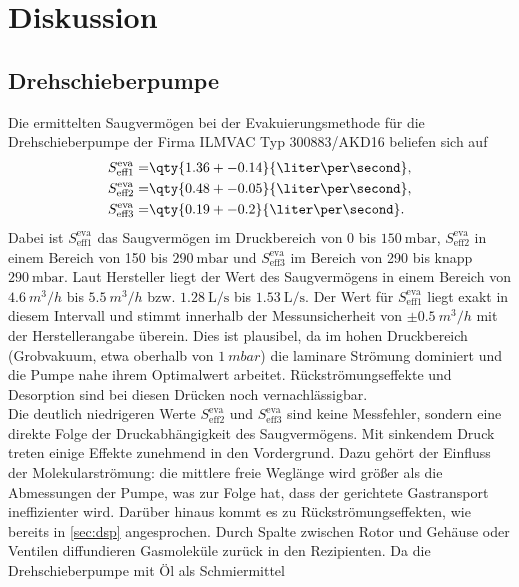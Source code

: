 \section{Diskussion}
\label{sec:Diskussion}

\subsection{Drehschieberpumpe}
Die ermittelten Saugvermögen bei der Evakuierungsmethode für die Drehschieberpumpe
der Firma ILMVAC Typ 300883/AKD16 beliefen sich auf 
\begin{align*}
    S_\text{eff1}^\text{eva} =& \qty{1.36+-0.14}{\liter\per\second}, \\
    S_\text{eff2}^\text{eva} =& \qty{0.48+-0.05}{\liter\per\second}, \\
    S_\text{eff3}^\text{eva} =& \qty{0.19+-0.2}{\liter\per\second}.
\end{align*}
Dabei ist $S_\text{eff1}^\text{eva}$ das Saugvermögen im Druckbereich von 0 bis 
$\qty{150}{\milli\bar}$, $S_\text{eff2}^\text{eva}$ in einem Bereich von 150 bis 
$\qty{290}{\milli\bar}$ und $S_\text{eff3}^\text{eva}$ im Bereich von 290 bis 
knapp $\qty{290}{\milli\bar}$. Laut Hersteller liegt der Wert des Saugvermögens 
in einem Bereich von $\qty{4.6}{m^3/h}$ bis $\qty{5.5}{m^3/h}$ bzw. 
$\qty{1.28}{\liter\per\second}$ bis $\qty{1.53}{\liter\per\second}$. Der Wert für 
$S_\text{eff1}^\text{eva}$ liegt exakt in diesem Intervall und stimmt innerhalb
der Messunsicherheit von $±\qty{0.5}{m^3/h}$ mit der Herstellerangabe überein.
Dies ist plausibel, da im hohen Druckbereich (Grobvakuum, etwa oberhalb von
$\qty{1}{mbar}$) die laminare Strömung dominiert und die Pumpe nahe ihrem
Optimalwert arbeitet. Rückströmungseffekte und Desorption sind bei diesen Drücken
noch vernachlässigbar.
\\
Die deutlich niedrigeren Werte $S_\text{eff2}^\text{eva}$ und 
$S_\text{eff3}^\text{eva}$ sind keine Messfehler, sondern eine direkte Folge der 
Druckabhängigkeit des Saugvermögens. Mit sinkendem Druck treten einige Effekte
zunehmend in den Vordergrund. Dazu gehört der Einfluss der Molekularströmung: 
die mittlere freie Weglänge wird größer als die Abmessungen der Pumpe, was zur 
Folge hat, dass der gerichtete Gastransport ineffizienter wird. Darüber hinaus 
kommt es zu Rückströmungseffekten, wie bereits in \autoref{sec:dsp} angesprochen.
Durch Spalte zwischen Rotor und Gehäuse oder Ventilen diffundieren Gasmoleküle 
zurück in den Rezipienten. Da die Drehschieberpumpe mit Öl als Schmiermittel 
